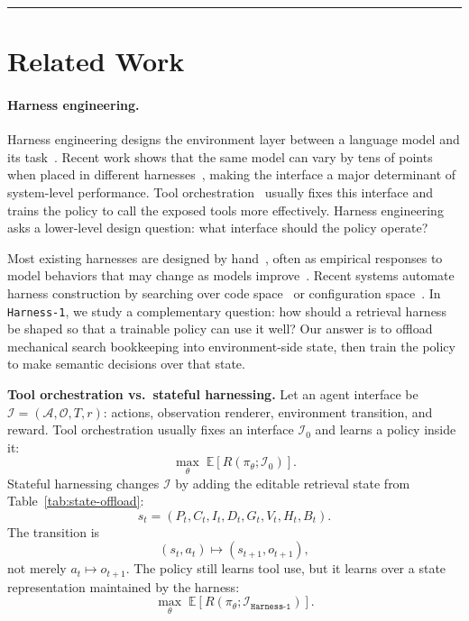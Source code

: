 \documentclass{article}
\newcommand\DoToC{%
  \startcontents
  \begingroup
  \setcounter{tocdepth}{2}
  \printcontents{}{1}{\textbf{Contents of Appendix}\vskip3pt\hrule\vskip5pt}
  \vskip3pt\hrule\vskip5pt
  \endgroup
}
\newcommand{\sys}{\texttt{Harness-1}\xspace}
\begin{document}
\clearpage
\DoToC

\appendix

\section{Related Work}
\label{app:related}

\paragraph{Harness engineering.}
Harness engineering designs the environment layer between a language
model and its task~\citep{openai2026harness,martin2026managed}. Recent
work shows that the same model can vary by tens of points when placed
in different harnesses~\citep{yang2024sweagent,
xia2024agentlessdemystifyingllmbasedsoftware}, making
the interface a major determinant of system-level performance. Tool
orchestration~\citep{qin2023toolllm,jin2025searchr1,liu2025webexplorer,su2025toolorchestraelevatingintelligenceefficient}
usually fixes this interface and trains the policy to call the exposed
tools more effectively. Harness engineering asks a lower-level design
question: what interface should the policy operate?

Most existing harnesses are designed by hand~\citep{yang2024sweagent,
zhang2025generalmodularharnessllm}, often as empirical responses to
model behaviors that may change as models improve~\citep{martin2026managed}.
Recent systems automate harness construction by searching over code
space~\citep{lou2026autoharness,lee2026meta} or configuration
space~\citep{sengupta2026harborautomatedharnessoptimization}. In
\sys, we study a complementary question: how should a retrieval harness
be shaped so that a trainable policy can use it well? Our answer is to
offload mechanical search bookkeeping into environment-side state, then
train the policy to make semantic decisions over that state.

\begin{keybox}
\textbf{Tool orchestration vs.\ stateful harnessing.}
Let an agent interface be
$\mathcal{I}=(\mathcal{A},\mathcal{O},T,r)$: actions,
observation renderer, environment transition, and reward. Tool
orchestration usually fixes an interface $\mathcal{I}_0$ and learns a
policy inside it:
\[
\max_\theta \; \mathbb{E}\!\left[R(\pi_\theta;\mathcal{I}_0)\right].
\]
Stateful harnessing changes $\mathcal{I}$ by adding the editable
retrieval state from Table~\ref{tab:state-offload}:
\[
s_t=(P_t,C_t,I_t,D_t,G_t,V_t,H_t,B_t).
\]
The transition is
\[
(s_t,a_t)\mapsto(s_{t+1},o_{t+1}),
\]
not merely $a_t\mapsto o_{t+1}$. The policy still learns tool use, but
it learns over a state representation maintained by the harness:
\[
\max_\theta \; \mathbb{E}\!\left[R(\pi_\theta;\mathcal{I}_{\sys})\right].
\]
\end{keybox}
\end{document}
